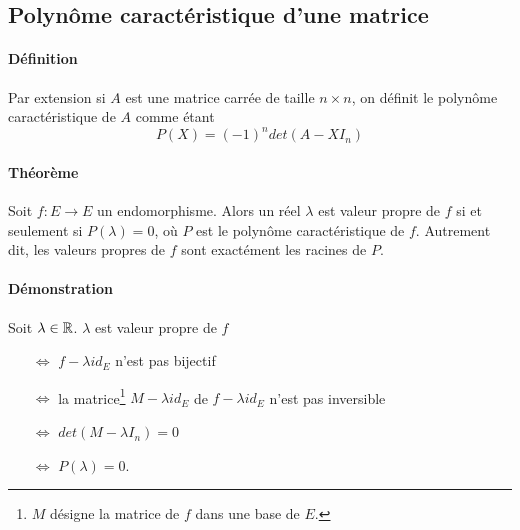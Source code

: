 %
\subsection{Polynôme caractéristique d'une matrice}
%
\paragraph{Définition} Par extension si $A$ est une matrice carrée de taille $n\times n$, on définit le polynôme caractéristique de $A$ comme étant
$$P(X) = (-1)^n det(A -X I_n)$$

\paragraph{Théorème} Soit $f: E \rightarrow E$ un endomorphisme. Alors un réel $\lambda$ est valeur propre de $f$ si et seulement si $P(\lambda) = 0$, où $P$ est le polynôme caractéristique de $f$. Autrement dit, les valeurs propres de $f$ sont exactément les racines de $P$.

\paragraph{Démonstration} Soit $\lambda \in \mathbb{R}$. $\lambda$ est valeur propre de $f$
\begin{itemize}
  \item[$\Leftrightarrow$] $f - \lambda id_E$ n'est pas bijectif 
  \item[$\Leftrightarrow$] la matrice\footnote{$M$ désigne la matrice de $f$ dans une base de $E$.} $M- \lambda id_E$ de $f- \lambda id_E$ n'est pas inversible
  \item[$\Leftrightarrow$] $det(M - \lambda I_n) = 0$
  \item[$\Leftrightarrow$] $P(\lambda) = 0$.
\end{itemize}

